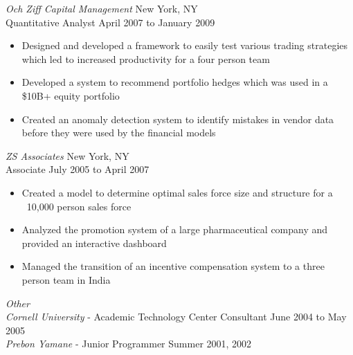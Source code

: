 \documentclass{res}
\begin{document}
\begin{resume}
{\sl Och Ziff Capital Management} \hfill New York, NY \\
Quantitative Analyst \hfill   April 2007 to January 2009  
   \begin{itemize} \itemsep -2pt %
   \item Designed and developed a framework to easily test various trading strategies which led to increased productivity for a four person team
   \item Developed a system to recommend portfolio hedges which was used in a \$10B+ equity portfolio
   \item Created an anomaly detection system to identify mistakes in vendor data before they were used by the financial models
 \end{itemize} %

{\sl ZS Associates} \hfill New York, NY \\
Associate \hfill July 2005 to April 2007
 \begin{itemize} \itemsep -2pt
  \item Created a model to determine optimal sales force size and structure for a ~10,000 person sales force
  \item Analyzed the promotion system of a large pharmaceutical company and provided an interactive dashboard
  \item Managed the transition of an incentive compensation system to a three person team in India
\end{itemize} %

{\sl Other} \\
{\sl Cornell University} - Academic Technology Center Consultant \hfill June 2004 to May 2005 \\
{\sl Prebon Yamane} - Junior Programmer \hfill Summer 2001, 2002 \\
\vspace{-14pt}
 

\end{resume}
\end{document}
